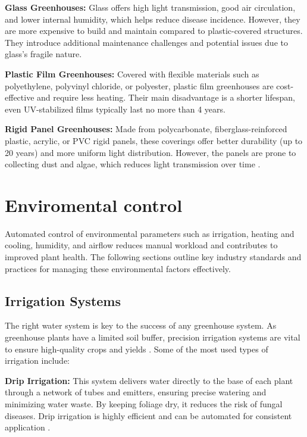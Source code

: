 \textbf{Glass Greenhouses:} Glass offers high light transmission, good air circulation, and lower internal humidity, which helps reduce disease incidence. However, they are more expensive to build and maintain compared to plastic-covered structures. They introduce additional maintenance challenges and potential issues due to glass's fragile nature.

\textbf{Plastic Film Greenhouses:} Covered with flexible materials such as polyethylene, polyvinyl chloride, or polyester, plastic film greenhouses are cost-effective and require less heating. Their main disadvantage is a shorter lifespan, even UV-stabilized films typically last no more than 4 years.

\textbf{Rigid Panel Greenhouses:} Made from polycarbonate, fiberglass-reinforced plastic, acrylic, or PVC rigid panels, these coverings offer better durability (up to 20 years) and more uniform light distribution. However, the panels are prone to collecting dust and algae, which reduces light transmission over time \citep{verma2022}.

\section{Enviromental control}

Automated control of environmental parameters such as irrigation, heating and cooling, humidity, and airflow reduces manual workload and contributes to improved plant health. The following sections outline key industry standards and practices for managing these environmental factors effectively.

\subsection{Irrigation Systems}\label{irrig}

The right water system is key to the success of any greenhouse system. As greenhouse plants have a limited soil buffer, precision irrigation systems are vital to ensure high-quality crops and yields \citep{vegtech_netafim}.
Some of the most used types of irrigation include:

\textbf{Drip Irrigation:} This system delivers water directly to the base of each plant through a network of tubes and emitters, ensuring precise watering and minimizing water waste. By keeping foliage dry, it reduces the risk of fungal diseases. Drip irrigation is highly efficient and can be automated for consistent application \citep{cedar_greenhouse}.

